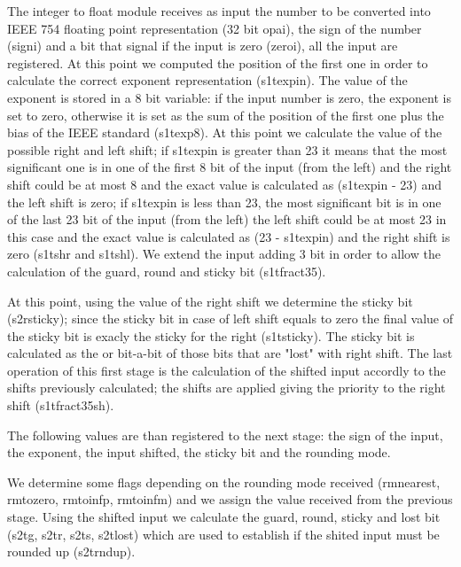 The integer to float module receives as input the number to be converted into IEEE 754 floating point representation (32 bit opa\textunderscore i), the sign of the number (sign\textunderscore i) and a bit that signal if the input is zero (zero\textunderscore i), all the input are registered.
At this point we computed the position of the first one in order to calculate the correct exponent representation (s1t\textunderscore exp\textunderscore in). The value of the exponent is stored in a 8 bit variable: if the input number is zero, the exponent is set to zero, otherwise it is set as the sum of the position of the first one plus the bias of the IEEE standard (s1t\textunderscore exp8).
At this point we calculate the value of the possible right and left shift; if s1t\textunderscore exp\textunderscore in is greater than 23 it means that the most significant one is in one of the first 8 bit of the input (from the left) and the right shift could be at most 8 and the exact value is calculated as (s1t\textunderscore exp\textunderscore in - 23) and the left shift is zero; if s1t\textunderscore exp\textunderscore in is less than 23, the most significant bit is in one of the last 23 bit of the input (from the left) the left shift could be at most 23 in this case and the exact value is calculated as (23 - s1t\textunderscore exp\textunderscore in) and the right shift is zero (s1t\textunderscore shr and s1t\textunderscore shl).
We extend the input adding 3 bit in order to allow the calculation of the guard, round and sticky bit (s1t\textunderscore fract35).

At this point, using the value of the right shift we determine the sticky bit (s2r\textunderscore sticky); since the sticky bit in case of left shift equals to zero the final value of the sticky bit is exacly the sticky for the right (s1t\textunderscore sticky).
The sticky bit is calculated as the or bit-a-bit of those bits that are "lost" with right shift. 
The last operation of this first stage is the calculation of the shifted input accordly to the shifts previously calculated; the shifts are applied giving the priority to the right shift (s1t\textunderscore fract35sh).

The following values are than registered to the next stage: the sign of the input, the exponent, the input shifted, the sticky bit and the rounding mode.

We determine some flags depending on the rounding mode received (rm\textunderscore nearest, rm\textunderscore to\textunderscore zero, rm\textunderscore to\textunderscore infp, rm\textunderscore to\textunderscore infm) and we assign the value received from the previous stage.
Using the shifted input we calculate the guard, round, sticky and lost bit (s2t\textunderscore g, s2t\textunderscore r, s2t\textunderscore s, s2t\textunderscore lost) which are used to establish if the shited input must be rounded up (s2t\textunderscore rnd\textunderscore up). 

